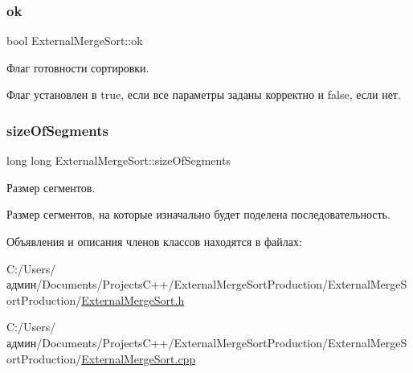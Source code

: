 \subsubsection{\texorpdfstring{ok}{ok}}
{\footnotesize\ttfamily bool External\+Merge\+Sort\+::ok\hspace{0.3cm}{\ttfamily [private]}}



Флаг готовности сортировки. 

Флаг установлен в true, если все параметры заданы корректно и false, если нет. \hypertarget{class_external_merge_sort_a1d68bb5e0373cf16807a41272dff1a99}{}\label{class_external_merge_sort_a1d68bb5e0373cf16807a41272dff1a99} 
\subsubsection{\texorpdfstring{size\+Of\+Segments}{sizeOfSegments}}
{\footnotesize\ttfamily long long External\+Merge\+Sort\+::size\+Of\+Segments\hspace{0.3cm}{\ttfamily [private]}}



Размер сегментов. 

Размер сегментов, на которые изначально будет поделена последовательность. 

Объявления и описания членов классов находятся в файлах\+:\begin{DoxyCompactItemize}
\item 
C\+:/\+Users/админ/\+Documents/\+Projects\+C++/\+External\+Merge\+Sort\+Production/\+External\+Merge\+Sort\+Production/\hyperlink{_external_merge_sort_8h}{External\+Merge\+Sort.\+h}\item 
C\+:/\+Users/админ/\+Documents/\+Projects\+C++/\+External\+Merge\+Sort\+Production/\+External\+Merge\+Sort\+Production/\hyperlink{_external_merge_sort_8cpp}{External\+Merge\+Sort.\+cpp}\end{DoxyCompactItemize}
